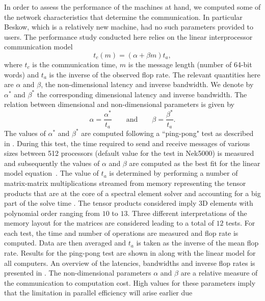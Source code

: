 \documentclass{sig-alternate}
\begin{document}
In order to assess the performance of the machines at hand, we computed  some of the network characteristics that determine the communication. In particular Beskow, which is a relatively new machine, had no such parameters provided to users. 
The performance study conducted here relies on the linear interprocessor communication  model
\begin{equation}
 t_c(m) = (\alpha + \beta m) t_a,\label{eqn:lincomm}
\end{equation}
where $t_c$ is the communication time, $m$ is the message length (number of
64-bit words) and $t_a$ is the inverse of the observed flop rate. The relevant
quantities here are $\alpha$ and $\beta$, the non-dimensional latency and inverse
 bandwidth. We denote by $\alpha^*$ and $\beta^*$ the corresponding dimensional 
latency and inverse bandwidth. The relation between dimensional and non-dimensional parameters is given by
\begin{equation*}
\alpha = \frac{\alpha^*}{t_a} \qquad \text{and} \qquad \beta = \frac{\beta^*}{t_a}.
\end{equation*}
The values of $\alpha^*$ and $\beta^*$ are computed following a ``ping-pong" test 
as described in \cite{fischer:scaling}. During this test, the time required to 
send and receive messages of various sizes between 512 processors (default value
for the test in Nek5000) is measured 
and subsequently the values of $\alpha$ and $\beta$ are computed as the best fit 
for the linear model equation~. The value of $t_a$ is determined by 
performing a number of matrix-matrix multiplications streamed from memory
representing the tensor products that are at the core of a spectral element 
solver \cite{fischer:hom} and accounting for a big part of the solve time 
\cite{Max2016}. The tensor products considered imply 3D elements with polynomial 
order ranging from $10$ to $13$. Three different interpretations of the memory 
layout for the matrices are considered 
leading to a total of $12$ tests. For each test, the time and number of operations are
measured and flop rate is computed. Data are then averaged and $t_a$ is taken as the
inverse of the mean flop rate. Results for the ping-pong test are shown in 
 along with the linear model for all computers. An overview 
of the latencies, bandwidths and inverse flop rates is presented in 
. The non-dimensional parameters $\alpha$ and $\beta$ are 
a relative measure of the communication to computation cost. High values for these
parameters imply that the limitation in parallel efficiency will arise earlier due 
\end{document}
